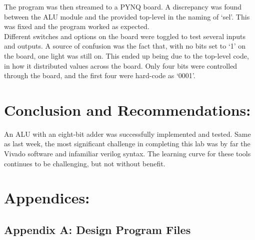 \documentclass[12pt,a4paper]{article}
\begin{document}
The program was then streamed to a PYNQ board. A discrepancy was found
between the ALU module and the provided top-level in the naming of `sel'.
This was fixed and the program worked as expected. \\

Different switches and options on the board were toggled to test
several inputs and outputs. A source of confusion was the fact that,
with no bits set to `1' on the board, one light was still on. This
ended up being due to the top-level code, in how it distributed values
across the board. Only four bits were controlled through the board,
and the first four were hard-code as `0001'.


\section*{Conclusion and Recommendations:}

An ALU with an eight-bit adder was successfully implemented and tested. 
Same as last week, the most significant challenge in completing this lab
was by far the Vivado software and infamiliar verilog syntax. The learning
curve for these tools continues to be challenging, but not without benefit.

\newpage
\section*{Appendices:}

\subsection{Appendix A: Design Program Files}
\end{document}
